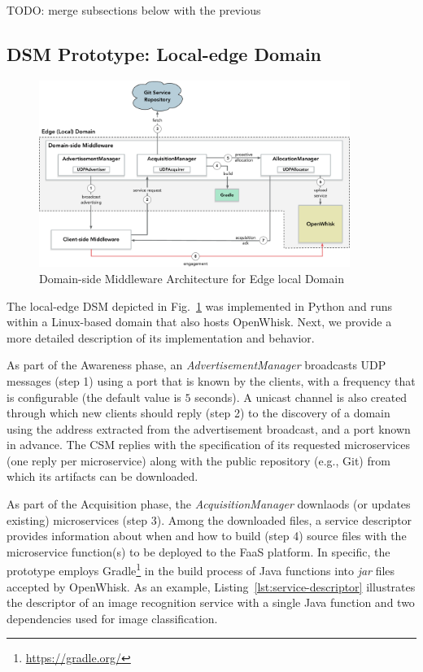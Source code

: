 


TODO: merge subsections below with the previous 

\subsection{DSM Prototype: Local-edge Domain}

\begin{figure}[tbp]
	\includegraphics[width=0.9\textwidth]{figs/a3e-domain-prototype}
	\caption{Domain-side Middleware Architecture for Edge local Domain}
	\label{fig:local-edge-domain-prototype}
\end{figure}

The local-edge DSM depicted in Fig.~\ref{fig:local-edge-domain-prototype} was implemented in Python and runs within a Linux-based domain that also hosts OpenWhisk. Next, we provide a more detailed description of its implementation and behavior.

As part of the Awareness phase, an \textit{AdvertisementManager} broadcasts UDP messages (step 1) using a port that is known by the clients, with a frequency that is configurable (the default value is $5$ seconds). A unicast channel is also created through which new clients should reply (step 2) to the discovery of a domain using the address extracted from the advertisement broadcast, and a port known in advance. The CSM replies with the specification of its requested microservices (one reply per microservice) along with the public repository (e.g., Git) from which its artifacts can be downloaded.

As part of the Acquisition phase, the \textit{AcquisitionManager} downlaods (or updates existing) microservices (step 3). Among the downloaded files, a service descriptor provides information about when and how to build (step 4) source files with the microservice function(s) to be deployed to the FaaS platform. In specific, the prototype employs Gradle\footnote{\url{https://gradle.org/}} in the build process of Java functions into \textit{jar} files accepted by OpenWhisk. As an example, Listing~\ref{lst:service-descriptor} illustrates the descriptor of an image recognition service with a single Java function and two dependencies used for image classification.

